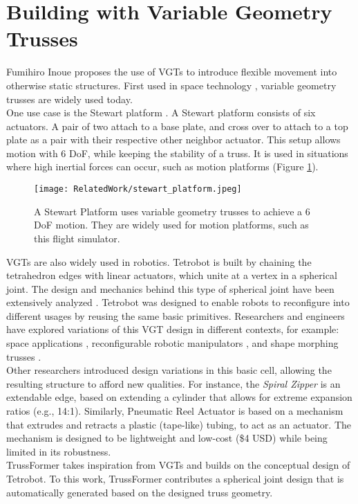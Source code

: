 \section{Building with Variable Geometry Trusses}
Fumihiro Inoue \cite{inoue:2008} proposes the use of \ac{VGT}s \cite{reinholtz:1990, rhodes:1985, spinos:2017} to introduce flexible movement into otherwise static structures. First used in space technology \cite{huang:1996}, variable geometry trusses are widely used today.\\
One use case is the Stewart platform \cite{stewart:1965}. A Stewart platform consists of six actuators. A pair of two attach to a base plate, and cross over to attach to a top plate as a pair with their respective other neighbor actuator. This setup allows motion with 6 DoF, while keeping the stability of a truss. It is used in situations where high inertial forces can occur, such as motion platforms (Figure \ref{fig:stewart_platform}).\\
\begin{figure}[h!]
    \texttt{[image: RelatedWork/stewart\_platform.jpeg]}
    \centering
    \caption{A Stewart Platform uses variable geometry trusses to achieve a 6 DoF motion. They are widely used for motion platforms, such as this flight simulator.}
    \label{fig:stewart_platform}
\end{figure}
VGTs are also widely used in robotics. Tetrobot \cite{hamlin:2013, hamlin:1997} is built by chaining the tetrahedron edges with linear actuators, which unite at a vertex in a spherical joint. The design and mechanics behind this type of spherical joint have been extensively analyzed \cite{sofla:2009, spinos2:2017}. Tetrobot was designed to enable robots to reconfigure into different usages by reusing the same basic primitives. Researchers and engineers have explored variations of this VGT design in different contexts, for example: space applications \cite{reinholtz:1990}, reconfigurable robotic manipulators \cite{reinholtz:1990, hamlin:2013}, and shape morphing trusses \cite{sofla:2009}.\\
Other researchers introduced design variations in this basic cell, allowing the resulting structure to afford new qualities. For instance, the \textit{Spiral Zipper} \cite{collins:2016} is an extendable edge, based on extending a cylinder that allows for extreme expansion ratios (e.g., 14:1). Similarly, Pneumatic Reel Actuator \cite{hammond:2017} is based on a mechanism that extrudes and retracts a plastic (tape-like) tubing, to act as an actuator. The mechanism is designed to be lightweight and low-cost (\$4 USD) while being limited in its robustness.\\
TrussFormer takes inspiration from VGTs and builds on the conceptual design of Tetrobot. To this work, TrussFormer contributes a spherical joint design that is automatically generated based on the designed truss geometry.

